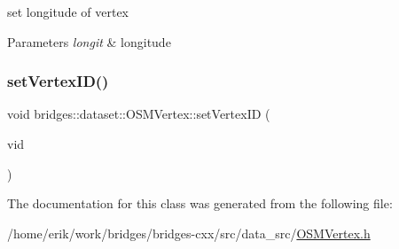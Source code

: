 set longitude of vertex


\begin{DoxyParams}{Parameters}
{\em longit} & longitude \\
\hline
\end{DoxyParams}
\mbox{\label{classbridges_1_1dataset_1_1_o_s_m_vertex_ae16bbcdef938da97f2c665825ecac346}} 
\subsubsection{\texorpdfstring{set\+Vertex\+I\+D()}{setVertexID()}}
{\footnotesize\ttfamily void bridges\+::dataset\+::\+O\+S\+M\+Vertex\+::set\+Vertex\+ID (\begin{DoxyParamCaption}\item[{\hyperlink{classbridges_1_1dataset_1_1_o_s_m_vertex_ad166f13b0aefbdc05a273546f2a3bb96}{O\+S\+M\+Vertex\+ID}}]{vid }\end{DoxyParamCaption})\hspace{0.3cm}{\ttfamily [inline]}}



The documentation for this class was generated from the following file\+:\begin{DoxyCompactItemize}
\item 
/home/erik/work/bridges/bridges-\/cxx/src/data\+\_\+src/\hyperlink{_o_s_m_vertex_8h}{O\+S\+M\+Vertex.\+h}\end{DoxyCompactItemize}
